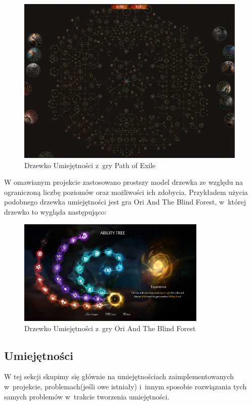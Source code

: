 \documentclass[oneside,polski,logo]{amuthesis}
\begin{document}
\begin{figure}[h]
	\centering
	\includegraphics[width=11cm]{images/kozubal/poe.png}
	\caption{Drzewko Umiejętności z~gry Path of Exile }
\end{figure}
\newpage
W omawianym projekcie zastosowano prostszy model drzewka ze względu na ograniczoną liczbę poziomów oraz możliwości ich zdobycia. Przykładem użycia podobnego drzewka umiejętności jest gra Ori And The Blind Forest, w~której drzewko to wygląda następująco:

\begin{figure}[h]
	\centering
	\includegraphics[width=9cm]{images/kozubal/ori.jpg}
	\caption{Drzewko Umiejętności z~gry Ori And The Blind Forest}
\end{figure}
\subsection{Umiejętności}
W tej sekcji skupimy się głównie na umiejętnościach zaimplementowanych w~projekcie, problemach(jeśli owe istniały) i~innym sposobie rozwiązania tych samych problemów w~trakcie tworzenia umiejętności.
\end{document}
